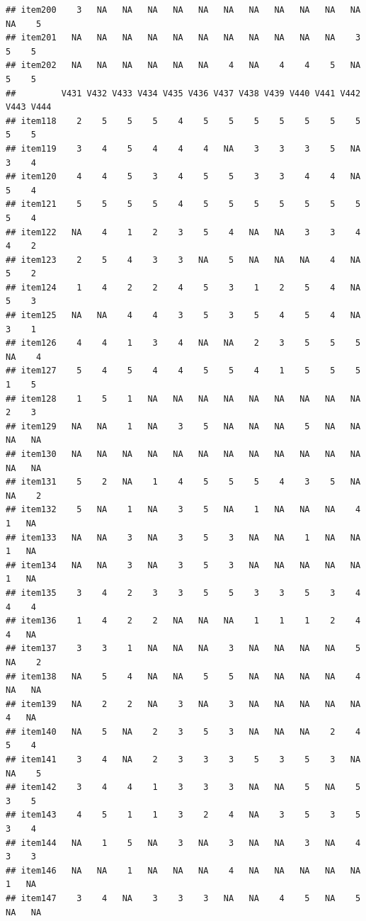 \documentclass[
  man]{apa6}
\begin{document}
\begin{verbatim}
## item200    3   NA   NA   NA   NA   NA   NA   NA   NA   NA   NA   NA   NA    5
## item201   NA   NA   NA   NA   NA   NA   NA   NA   NA   NA   NA    3    5    5
## item202   NA   NA   NA   NA   NA   NA    4   NA    4    4    5   NA    5    5
##         V431 V432 V433 V434 V435 V436 V437 V438 V439 V440 V441 V442 V443 V444
## item118    2    5    5    5    4    5    5    5    5    5    5    5    5    5
## item119    3    4    5    4    4    4   NA    3    3    3    5   NA    3    4
## item120    4    4    5    3    4    5    5    3    3    4    4   NA    5    4
## item121    5    5    5    5    4    5    5    5    5    5    5    5    5    4
## item122   NA    4    1    2    3    5    4   NA   NA    3    3    4    4    2
## item123    2    5    4    3    3   NA    5   NA   NA   NA    4   NA    5    2
## item124    1    4    2    2    4    5    3    1    2    5    4   NA    5    3
## item125   NA   NA    4    4    3    5    3    5    4    5    4   NA    3    1
## item126    4    4    1    3    4   NA   NA    2    3    5    5    5   NA    4
## item127    5    4    5    4    4    5    5    4    1    5    5    5    1    5
## item128    1    5    1   NA   NA   NA   NA   NA   NA   NA   NA   NA    2    3
## item129   NA   NA    1   NA    3    5   NA   NA   NA    5   NA   NA   NA   NA
## item130   NA   NA   NA   NA   NA   NA   NA   NA   NA   NA   NA   NA   NA   NA
## item131    5    2   NA    1    4    5    5    5    4    3    5   NA   NA    2
## item132    5   NA    1   NA    3    5   NA    1   NA   NA   NA    4    1   NA
## item133   NA   NA    3   NA    3    5    3   NA   NA    1   NA   NA    1   NA
## item134   NA   NA    3   NA    3    5    3   NA   NA   NA   NA   NA    1   NA
## item135    3    4    2    3    3    5    5    3    3    5    3    4    4    4
## item136    1    4    2    2   NA   NA   NA    1    1    1    2    4    4   NA
## item137    3    3    1   NA   NA   NA    3   NA   NA   NA   NA    5   NA    2
## item138   NA    5    4   NA   NA    5    5   NA   NA   NA   NA    4   NA   NA
## item139   NA    2    2   NA    3   NA    3   NA   NA   NA   NA   NA    4   NA
## item140   NA    5   NA    2    3    5    3   NA   NA   NA    2    4    5    4
## item141    3    4   NA    2    3    3    3    5    3    5    3   NA   NA    5
## item142    3    4    4    1    3    3    3   NA   NA    5   NA    5    3    5
## item143    4    5    1    1    3    2    4   NA    3    5    3    5    3    4
## item144   NA    1    5   NA    3   NA    3   NA   NA    3   NA    4    3    3
## item146   NA   NA    1   NA   NA   NA    4   NA   NA   NA   NA   NA    1   NA
## item147    3    4   NA    3    3    3   NA   NA    4    5   NA    5   NA   NA

\end{verbatim}
\end{document}
